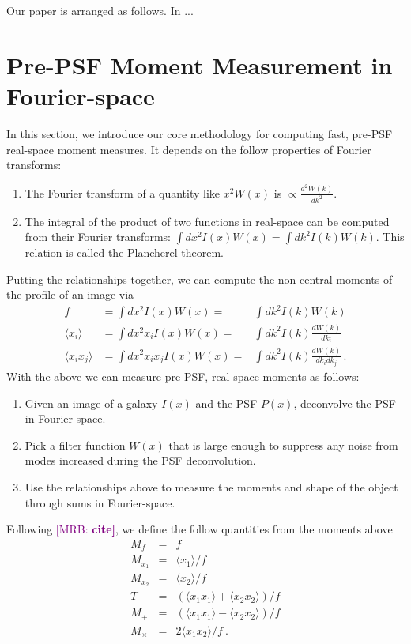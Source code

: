 \documentclass[twocolappendix, appendixfloats, numberedappendix, twocolumn, apj]{openjournal}
\newcommand{\mrb}[1]{\textcolor{purple}{[MRB: \bf #1]}\xspace}
\begin{document}
Our paper is arranged as follows. In ...

\section{Pre-PSF Moment Measurement in Fourier-space}

In this section, we introduce our core methodology for computing fast, pre-PSF real-space moment
measures. It depends on the follow properties of Fourier transforms:
\begin{enumerate}
\item The Fourier transform of a quantity like $x^2W(x)$ is $\propto\frac{d^{2}W(k)}{dk^2}$.
\item The integral of the product of two functions in real-space can be computed from their Fourier
      transforms: $\int dx^2 I(x)W(x) = \int dk^2 I(k)W(k)$. This relation is called the Plancherel theorem.
\end{enumerate}
Putting the relationships together, we can compute the non-central moments of the profile of
an image via
\begin{eqnarray}
f                          & = \int dx^2 I(x)W(x) =            & \int dk^2 I(k)W(k) \\
\langle x_{i} \rangle      & = \int dx^2 x_{i} I(x)W(x) =      & \int dk^2 I(k)\frac{dW(k)}{dk_i} \\
\langle x_{i}x_{j} \rangle & = \int dx^2 x_{i}x_{j} I(x)W(x) = & \int dk^2 I(k)\frac{dW(k)}{dk_{i}dk_{j}}\,.
\end{eqnarray}
With the above we can measure pre-PSF, real-space moments as follows:
\begin{enumerate}
\item Given an image of a galaxy $I(x)$ and the PSF $P(x)$, deconvolve the PSF in Fourier-space.
\item Pick a filter function $W(x)$ that is large enough to suppress any noise from modes increased
      during the PSF deconvolution.
\item Use the relationships above to measure the moments and shape of the object through sums in Fourier-space.
\end{enumerate}
Following \mrb{cite}, we define the follow quantities from the moments above
\begin{eqnarray}
M_{f} & = & f \nonumber \\
M_{x_1} & = & \langle x_{1} \rangle/f \nonumber \\
M_{x_2} & = & \langle x_{2} \rangle/f \nonumber \\
T & = & (\langle x_{1}x_{1} \rangle + \langle x_{2}x_{2} \rangle)/f \nonumber \\
M_{+} & = & (\langle x_{1}x_{1} \rangle - \langle x_{2}x_{2} \rangle)/f \nonumber \\
M_{\times} & = & 2 \langle x_{1}x_{2} \rangle/f\ . \nonumber
\end{eqnarray}
\end{document}
